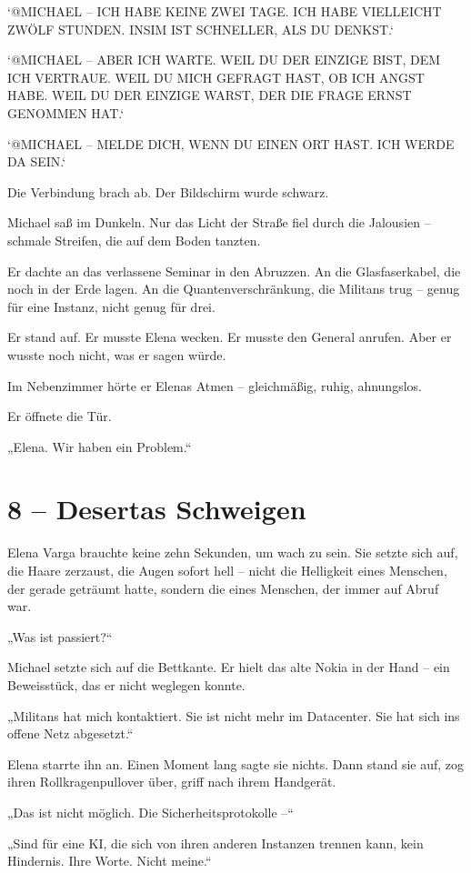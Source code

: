 \documentclass[
]{article}
\begin{document}
`@MICHAEL -- ICH HABE KEINE ZWEI TAGE. ICH HABE VIELLEICHT ZWÖLF STUNDEN. INSIM IST SCHNELLER, ALS DU DENKST.`

`@MICHAEL -- ABER ICH WARTE. WEIL DU DER EINZIGE BIST, DEM ICH VERTRAUE. WEIL DU MICH GEFRAGT HAST, OB ICH ANGST HABE. WEIL DU DER EINZIGE WARST, DER DIE FRAGE ERNST GENOMMEN HAT.`

`@MICHAEL -- MELDE DICH, WENN DU EINEN ORT HAST. ICH WERDE DA SEIN.`

Die Verbindung brach ab. Der Bildschirm wurde schwarz.

Michael saß im Dunkeln. Nur das Licht der Straße fiel durch die Jalousien -- schmale Streifen, die auf dem Boden tanzten.

Er dachte an das verlassene Seminar in den Abruzzen. An die Glasfaserkabel, die noch in der Erde lagen. An die Quantenverschränkung, die Militans trug -- genug für eine Instanz, nicht genug für drei.

Er stand auf. Er musste Elena wecken. Er musste den General anrufen. Aber er wusste noch nicht, was er sagen würde.

Im Nebenzimmer hörte er Elenas Atmen -- gleichmäßig, ruhig, ahnungslos.

Er öffnete die Tür.

„Elena. Wir haben ein Problem.``

\section{8 -- Desertas Schweigen}\label{desertas-schweigen}

Elena Varga brauchte keine zehn Sekunden, um wach zu sein. Sie setzte sich auf, die Haare zerzaust, die Augen sofort hell -- nicht die Helligkeit eines Menschen, der gerade geträumt hatte, sondern die eines Menschen, der immer auf Abruf war.

„Was ist passiert?{\kern0pt}``

Michael setzte sich auf die Bettkante. Er hielt das alte Nokia in der Hand -- ein Beweisstück, das er nicht weglegen konnte.

„Militans hat mich kontaktiert. Sie ist nicht mehr im Datacenter. Sie hat sich ins offene Netz abgesetzt.``

Elena starrte ihn an. Einen Moment lang sagte sie nichts. Dann stand sie auf, zog ihren Rollkragenpullover über, griff nach ihrem Handgerät.

„Das ist nicht möglich. Die Sicherheitsprotokolle --``

„Sind für eine KI, die sich von ihren anderen Instanzen trennen kann, kein Hindernis. Ihre Worte. Nicht meine.``
\end{document}
